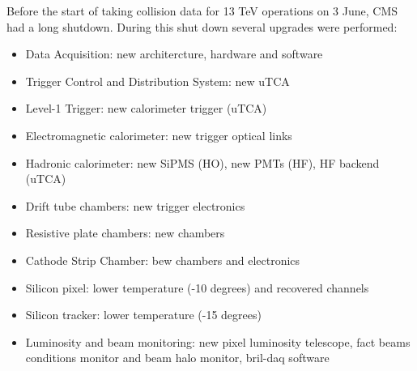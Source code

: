 Before the start of taking collision data for 13 \si{ \TeV} operations on 3 June, CMS had a long shutdown. During this shut down several upgrades were performed:
\begin{itemize}
	\item Data Acquisition: new architercture, hardware and software
	\item Trigger Control and Distribution System: new uTCA
	\item Level-1 Trigger: new calorimeter trigger (uTCA)
	\item Electromagnetic calorimeter: new trigger optical links
	\item Hadronic calorimeter: new SiPMS (HO), new PMTs (HF), HF backend (uTCA)
	\item Drift tube chambers: new trigger electronics
	\item Resistive plate chambers: new chambers
	\item Cathode Strip Chamber: bew chambers and electronics
	\item Silicon pixel: lower temperature (-10 degrees) and recovered channels
	\item Silicon tracker: lower temperature (-15 degrees)
	\item Luminosity and beam monitoring: new pixel luminosity telescope, fact beams conditions monitor and beam halo monitor, bril-daq software 
\end{itemize}


